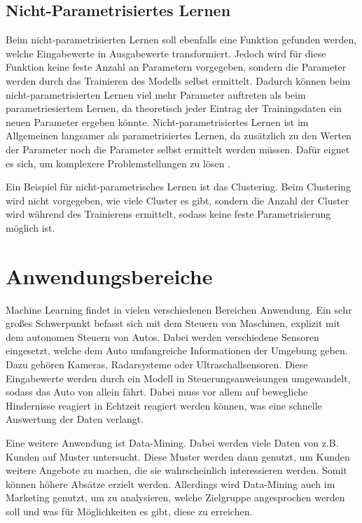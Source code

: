 \subsection{Nicht-Parametrisiertes Lernen}
\label{nichtParametrisiertesLernen}
Beim nicht-parametrisierten Lernen soll ebenfalls eine Funktion gefunden werden, welche Eingabewerte in Ausgabewerte transformiert. Jedoch wird für diese Funktion keine feste Anzahl an Parametern vorgegeben, sondern die Parameter werden durch das Trainieren des Modells selbst ermittelt. Dadurch können beim nicht-parametrisierten Lernen viel mehr Parameter auftreten als beim parametriesiertem Lernen, da theoretisch jeder Eintrag der Trainingsdaten ein neuen Parameter ergeben könnte. Nicht-parametrisiertes Lernen ist im Allgemeinen langsamer als parametrisiertes Lernen, da zusätzlich zu den Werten der Parameter noch die Parameter selbst ermittelt werden müssen. Dafür eignet es sich, um komplexere Problemstellungen zu lösen \cite[vgl.][]{paraNichtPara}.

Ein Beispiel für nicht-parametrisches Lernen ist das Clustering. Beim Clustering wird nicht vorgegeben, wie viele Cluster es gibt, sondern die Anzahl der Cluster wird während des Trainierens ermittelt, sodass keine feste Parametrisierung möglich ist.

\section{Anwendungsbereiche}
\label{sec:anwendungsbereiche}
Machine Learning findet in vielen verschiedenen Bereichen Anwendung. Ein sehr großes Schwerpunkt befasst sich mit dem Steuern von Maschinen, explizit mit dem autonomen Steuern von Autos. Dabei werden verschiedene Sensoren eingesetzt, welche dem Auto umfangreiche Informationen der Umgebung geben. Dazu gehören Kameras, Radarsysteme oder Ultraschallsensoren. Diese Eingabewerte werden durch ein Modell in Steuerungsanweisungen umgewandelt, sodass das Auto von allein fährt. Dabei muss vor allem auf bewegliche Hindernisse reagiert in Echtzeit reagiert werden können, was eine schnelle Auswertung der Daten verlangt.

Eine weitere Anwendung ist Data-Mining. Dabei werden viele Daten von z.B. Kunden auf Muster untersucht. Diese Muster werden dann genutzt, um Kunden weitere Angebote zu machen, die sie wahrscheinlich interessieren werden. Somit können höhere Absätze erzielt werden. Allerdings wird Data-Mining auch im Marketing genutzt, um zu analysieren, welche Zielgruppe angesprochen werden soll und was für Möglichkeiten es gibt, diese zu erreichen.

